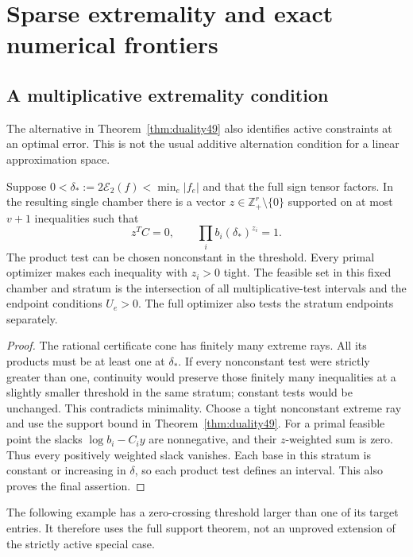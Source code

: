 \section{Sparse extremality and exact numerical frontiers}\label{sec:examples49}
\subsection{A multiplicative extremality condition}
The alternative in Theorem~\ref{thm:duality49} also identifies active
constraints at an optimal error. This is not the usual additive
alternation condition for a linear approximation space.

\begin{proposition}\label{prop:tight49}
Suppose $0<\delta_*:=2\mathcal E_2(f)<\min_e|f_e|$ and that the
full sign tensor factors. In the resulting single chamber there is
a vector $z\in\mathbb Z_+^r\setminus\{0\}$ supported on at most
$v+1$ inequalities such that
\[
 z^TC=0,\qquad \prod_i b_i(\delta_*)^{z_i}=1.
\]
The product test can be chosen nonconstant in the threshold.
Every primal optimizer makes each inequality with $z_i>0$ tight.
The feasible set in this fixed chamber and stratum is the intersection of all multiplicative-test intervals and the endpoint conditions $U_e>0$. The full optimizer also tests the stratum endpoints separately.
\end{proposition}
\begin{proof}
The rational certificate cone has finitely many extreme rays. All its
products must be at least one at $\delta_*$. If every nonconstant test were strictly
greater than one, continuity would preserve those finitely many
inequalities at a slightly smaller threshold in the same stratum;
constant tests would be unchanged. This contradicts minimality.
Choose a tight nonconstant extreme ray and use the support bound in
Theorem~\ref{thm:duality49}. For a primal feasible point the slacks
$\log b_i-C_i y$ are nonnegative, and their $z$-weighted sum is zero.
Thus every positively weighted slack vanishes. Each base in this
stratum is constant or increasing in $\delta$, so each product test
defines an interval. This also proves the final assertion.
\end{proof}

The following example has a zero-crossing threshold larger than one
of its target entries. It therefore uses the full support theorem,
not an unproved extension of the strictly active special case.


